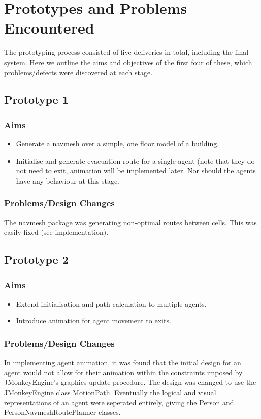 \documentclass{article}
\begin{document}
\section{Prototypes and Problems Encountered}
The prototyping process consisted of five deliveries in total, including the final system. Here we outline the aims and objectives of the first four of these, which problems/defects were discovered at each stage.

\subsection{Prototype 1}
\subsubsection{Aims}
\begin{itemize}
\item{Generate a navmesh over a simple, one floor model of a building.}
\item{Initialise and generate evacuation route for a single agent (note that they do not need to exit, animation will be implemented later. Nor should the agents have any behaviour at this stage.}
\end{itemize}
\subsubsection{Problems/Design Changes}
The navmesh package was generating non-optimal routes between cells. This was easily fixed (see implementation).

\subsection{Prototype 2}
\subsubsection{Aims}
\begin{itemize}
\item{Extend initialisation and path calculation to multiple agents.}
\item{Introduce animation for agent movement to exits.}
\end{itemize}
\subsubsection{Problems/Design Changes}
In implementing agent animation, it was found that the initial design for an agent would not allow for their animation within the constraints imposed by JMonkeyEngine's graphics update procedure. The design was changed to use the JMonkeyEngine class MotionPath. Eventually the logical and visual representations of an agent were seperated entirely, giving the Person and PersonNavmeshRoutePlanner classes.
\end{document}
